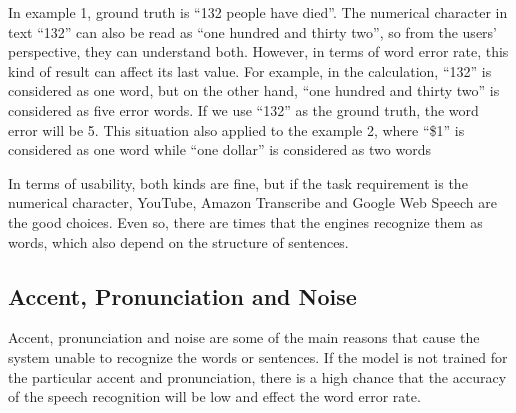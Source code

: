 \documentclass[natbib]{muthesis}
\begin{document}
 In example 1, ground truth is ``132 people have died''. The numerical character in text ``132'' can also be read as ``one hundred and thirty two'', so from the users' perspective, they can understand both. However, in terms of word error rate, this kind of result can affect its last value. For example, in the calculation, ``132'' is considered as one word, but on the other hand, ``one hundred and thirty two'' is considered as five error words. If we use ``132'' as the ground truth, the word error will be 5. This situation also applied to the example 2, where ``\$1'' is considered as one word while ``one dollar'' is considered as two words
 
 In terms of usability, both kinds are fine, but if the task requirement is the numerical character, YouTube, Amazon Transcribe and Google Web Speech are the good choices. Even so, there are times that the engines recognize them as words, which also depend on the structure of sentences.
 
 
 \subsection{Accent, Pronunciation and Noise}
 Accent, pronunciation and noise are some of the main reasons that cause the system unable to recognize the words or sentences. If the model is not trained for the particular accent and pronunciation, there is a high chance that the accuracy of the speech recognition will be low and effect the word error rate.
 
 \begin{center}
 \end{center}
\end{document}
